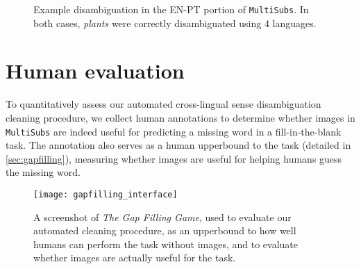 \documentclass[twocolumn]{svjour3}          \smartqed  \usepackage{graphicx}
\newcommand{\multisubs}{\texttt{MultiSubs}\xspace}
\begin{document}
\begin{figure}[t]
    \centering
    \caption{Example disambiguation in the EN-PT portion of \multisubs. In both cases, \textit{plants} were correctly disambiguated using 4 languages.}
    \label{fig:egdisambiguation}
\end{figure}

\section{Human evaluation}
\label{sec:gapfilling-human}

To quantitatively assess our automated cross-lingual sense disambiguation cleaning procedure, we collect human annotations to determine whether images in \multisubs are indeed useful for predicting a missing word in a fill-in-the-blank task. The annotation also serves as a human upperbound to the task (detailed in \ref{sec:gapfilling}), measuring whether images are useful for helping humans guess the missing word.

\begin{figure}
    \centering
    \texttt{[image: gapfilling\_interface]}
    \caption{A screenshot of \textit{The Gap Filling Game}, used to evaluate our automated cleaning procedure, as an upperbound to how well humans can perform the task without images, and to evaluate whether images are actually useful for the task.}
    \label{fig:interface}
\end{figure}
\end{document}
